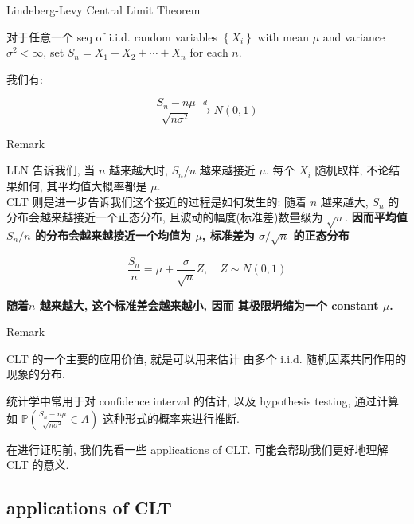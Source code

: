 \documentclass{qlnotes-export}
\begin{document}
\begin{theorem}{Lindeberg-Levy Central Limit Theorem}\label{thm-05-clt-lindeberg-levy-central-limit-theorem}

对于任意一个 seq of i.i.d. random variables \(\left\{ X_{i} \right\}\) with mean \(\mu\) and variance \(\sigma^{2} < \infty\), set \(S_{n} = X_{1} + X_{2} + \cdots + X_{n}\) for each \(n\).

我们有:

\[\frac{S_{n} - n\mu}{\sqrt{n\sigma^{2}}}\overset{d}{\rightarrow}N(0,1)\]

\end{theorem}

\begin{qlremark}{Remark}

LLN 告诉我们, 当 \(n\) 越来越大时, \(S_{n}/n\) 越来越接近 \(\mu\). 每个 \(X_{i}\) 随机取样, 不论结果如何, 其平均值大概率都是 \(\mu\).\\
CLT 则是进一步告诉我们这个接近的过程是如何发生的: 随着 \(n\) 越来越大, \(S_{n}\) 的分布会越来越接近一个正态分布, 且波动的幅度(标准差)数量级为 \(\sqrt{n}\). \textbf{因而平均值 \(S_{n}/n\) 的分布会越来越接近一个均值为 \(\mu\), 标准差为 \(\sigma/\sqrt{n}\) 的正态分布}

\[\frac{S_{n}}{n} = \mu + \frac{\sigma}{\sqrt{n}}Z,\quad Z \sim N(0,1)\]

\textbf{随着\(n\) 越来越大, 这个标准差会越来越小, 因而 其极限坍缩为一个 constant \(\mu\).}\\

\end{qlremark}

\begin{qlremark}{Remark}

CLT 的一个主要的应用价值, 就是可以用来估计 由多个 i.i.d. 随机因素共同作用的现象的分布.

统计学中常用于对 confidence interval 的估计, 以及 hypothesis testing, 通过计算如 \({\mathbb{P}}\left( {\frac{S_{n} - n\mu}{\sqrt{n\sigma^{2}}} \in A} \right)\) 这种形式的概率来进行推断.\\

\end{qlremark}

在进行证明前, 我们先看一些 applications of CLT. 可能会帮助我们更好地理解 CLT 的意义.

\subsection{applications of CLT}\label{applications-of-clt}
\end{document}

